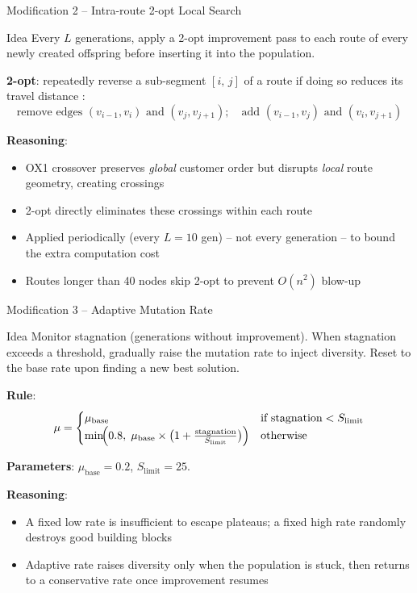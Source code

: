\documentclass{beamer}
\begin{document}
\begin{frame}{Modification 2 -- Intra-route 2-opt Local Search}
  \begin{block}{Idea}
    Every $L$ generations, apply a 2-opt improvement pass to each route
    of every newly created offspring before inserting it into the population.
  \end{block}

  \vspace{4pt}
  \textbf{2-opt}: repeatedly reverse a sub-segment $[i,\,j]$ of a route if
  doing so reduces its travel distance \cite{lin1965computer}:
  \[
    \text{remove edges } (v_{i-1}, v_i)\text{ and }(v_j, v_{j+1});
    \quad\text{add } (v_{i-1}, v_j)\text{ and }(v_i, v_{j+1})
  \]

  \vspace{4pt}
  \textbf{Reasoning}:
  \begin{itemize}
    \item OX1 crossover preserves \emph{global} customer order but disrupts
          \emph{local} route geometry, creating crossings
    \item 2-opt directly eliminates these crossings within each route
    \item Applied periodically (every $L=10$ gen) -- not every generation --
          to bound the extra computation cost
    \item Routes longer than 40 nodes skip 2-opt to prevent $O(n^2)$ blow-up
  \end{itemize}
\end{frame}

\begin{frame}{Modification 3 -- Adaptive Mutation Rate}
  \begin{block}{Idea}
    Monitor stagnation (generations without improvement).  When stagnation
    exceeds a threshold, gradually raise the mutation rate to inject
    diversity.  Reset to the base rate upon finding a new best solution.
  \end{block}

  \vspace{4pt}
  \textbf{Rule}:
  \[
    \mu =
    \begin{cases}
      \mu_{\text{base}} & \text{if stagnation} < S_{\text{limit}} \\
      \min\!\Bigl(0.8,\;\mu_{\text{base}} \times
        \bigl(1 + \tfrac{\text{stagnation}}{S_{\text{limit}}}\bigr)\Bigr)
        & \text{otherwise}
    \end{cases}
  \]

  \textbf{Parameters}: $\mu_{\text{base}} = 0.2$,\; $S_{\text{limit}} = 25$.

  \vspace{4pt}
  \textbf{Reasoning}:
  \begin{itemize}
    \item A fixed low rate is insufficient to escape plateaus; a fixed high
          rate randomly destroys good building blocks
    \item Adaptive rate raises diversity only when the population is stuck,
          then returns to a conservative rate once improvement resumes
  \end{itemize}
\end{frame}
\end{document}
